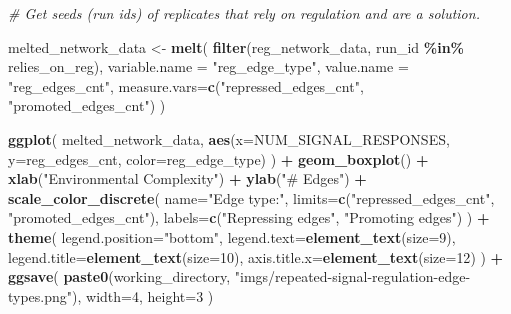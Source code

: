 \documentclass[
]{book}
\newenvironment{Shaded}{\begin{snugshade}}{\end{snugshade}}
\newcommand{\CommentTok}[1]{\textcolor[rgb]{0.56,0.35,0.01}{\textit{#1}}}
\newcommand{\DataTypeTok}[1]{\textcolor[rgb]{0.13,0.29,0.53}{#1}}
\newcommand{\DecValTok}[1]{\textcolor[rgb]{0.00,0.00,0.81}{#1}}
\newcommand{\KeywordTok}[1]{\textcolor[rgb]{0.13,0.29,0.53}{\textbf{#1}}}
\newcommand{\NormalTok}[1]{#1}
\newcommand{\OperatorTok}[1]{\textcolor[rgb]{0.81,0.36,0.00}{\textbf{#1}}}
\newcommand{\StringTok}[1]{\textcolor[rgb]{0.31,0.60,0.02}{#1}}
\begin{document}
\begin{Shaded}
\begin{Highlighting}[]
\CommentTok{\# Get seeds (run ids) of replicates that rely on regulation and are a solution.}

\NormalTok{melted\_network\_data \textless{}{-}}\StringTok{ }\KeywordTok{melt}\NormalTok{(}
  \KeywordTok{filter}\NormalTok{(reg\_network\_data, run\_id }\OperatorTok{\%in\%}\StringTok{ }\NormalTok{relies\_on\_reg),}
  \DataTypeTok{variable.name =} \StringTok{"reg\_edge\_type"}\NormalTok{,}
  \DataTypeTok{value.name =} \StringTok{"reg\_edges\_cnt"}\NormalTok{,}
  \DataTypeTok{measure.vars=}\KeywordTok{c}\NormalTok{(}\StringTok{"repressed\_edges\_cnt"}\NormalTok{, }\StringTok{"promoted\_edges\_cnt"}\NormalTok{)}
\NormalTok{)}

\KeywordTok{ggplot}\NormalTok{( melted\_network\_data, }\KeywordTok{aes}\NormalTok{(}\DataTypeTok{x=}\NormalTok{NUM\_SIGNAL\_RESPONSES, }\DataTypeTok{y=}\NormalTok{reg\_edges\_cnt, }\DataTypeTok{color=}\NormalTok{reg\_edge\_type) ) }\OperatorTok{+}
\StringTok{  }\KeywordTok{geom\_boxplot}\NormalTok{() }\OperatorTok{+}
\StringTok{  }\KeywordTok{xlab}\NormalTok{(}\StringTok{"Environmental Complexity"}\NormalTok{) }\OperatorTok{+}
\StringTok{  }\KeywordTok{ylab}\NormalTok{(}\StringTok{"\# Edges"}\NormalTok{) }\OperatorTok{+}
\StringTok{  }\KeywordTok{scale\_color\_discrete}\NormalTok{(}
    \DataTypeTok{name=}\StringTok{"Edge type:"}\NormalTok{,}
    \DataTypeTok{limits=}\KeywordTok{c}\NormalTok{(}\StringTok{"repressed\_edges\_cnt"}\NormalTok{, }\StringTok{"promoted\_edges\_cnt"}\NormalTok{),}
    \DataTypeTok{labels=}\KeywordTok{c}\NormalTok{(}\StringTok{"Repressing edges"}\NormalTok{, }\StringTok{"Promoting edges"}\NormalTok{)}
\NormalTok{  ) }\OperatorTok{+}
\StringTok{  }\KeywordTok{theme}\NormalTok{(}
    \DataTypeTok{legend.position=}\StringTok{"bottom"}\NormalTok{,}
    \DataTypeTok{legend.text=}\KeywordTok{element\_text}\NormalTok{(}\DataTypeTok{size=}\DecValTok{9}\NormalTok{),}
    \DataTypeTok{legend.title=}\KeywordTok{element\_text}\NormalTok{(}\DataTypeTok{size=}\DecValTok{10}\NormalTok{),}
    \DataTypeTok{axis.title.x=}\KeywordTok{element\_text}\NormalTok{(}\DataTypeTok{size=}\DecValTok{12}\NormalTok{)}
\NormalTok{  ) }\OperatorTok{+}
\StringTok{  }\KeywordTok{ggsave}\NormalTok{(}
    \KeywordTok{paste0}\NormalTok{(working\_directory, }\StringTok{"imgs/repeated{-}signal{-}regulation{-}edge{-}types.png"}\NormalTok{),}
    \DataTypeTok{width=}\DecValTok{4}\NormalTok{,}
    \DataTypeTok{height=}\DecValTok{3}
\NormalTok{  )}
\end{Highlighting}
\end{Shaded}
\end{document}

